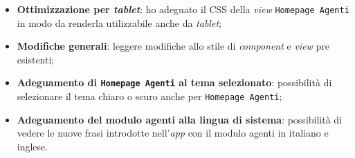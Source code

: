 \begin{itemize}
    \item \textbf{Ottimizzazione per \textit{tablet}}: ho adeguato il CSS della \textit{view} \texttt{Homepage Agenti} in 
          modo da renderla utilizzabile anche da \textit{tablet};
    \item \textbf{Modifiche generali}: leggere modifiche allo stile di \textit{component} e \textit{view} pre esistenti;
    \item \textbf{Adeguamento di \texttt{Homepage Agenti} al tema selezionato}: possibilità di selezionare il tema chiaro 
          o scuro anche per \texttt{Homepage Agenti};
    \item \textbf{Adeguamento del modulo agenti alla lingua di sistema}: possibilità di vedere le nuove frasi 
          introdotte nell'\textit{app} con il modulo agenti in italiano e inglese.
\end{itemize}